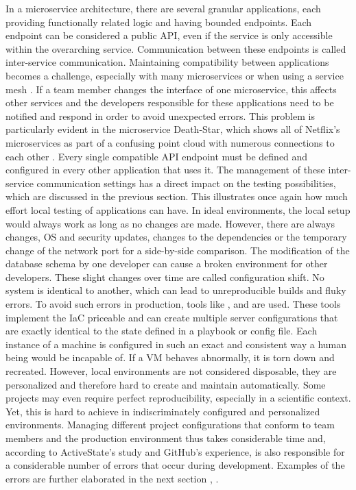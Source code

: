         In a microservice architecture, there are several granular applications, each providing functionally related logic and having bounded endpoints. Each endpoint can be considered a public \ac{API}, even if the service is only accessible within the overarching service. Communication between these endpoints is called inter-service communication. Maintaining compatibility between applications becomes a challenge, especially with many microservices or when using a service mesh \cite{micro}. If a team member changes the interface of one microservice, this affects other services and the developers responsible for these applications need to be notified and respond in order to avoid unexpected errors. This problem is particularly evident in the microservice Death-Star, which shows all of Netflix's microservices as part of a confusing point cloud with numerous connections to each other \cite{deathstar}. Every single compatible \ac{API} endpoint must be defined and configured in every other application that uses it. The management of these inter-service communication settings has a direct impact on the testing possibilities, which are discussed in the previous section. This illustrates once again how much effort local testing of applications can have.\newline
        In ideal environments, the local setup would always work as long as no changes are made. However, there are always changes, \ac{OS} and security updates, changes to the dependencies or the temporary change of the network port for a side-by-side comparison. The modification of the database schema by one developer can cause a broken environment for other developers. These slight changes over time are called configuration shift. No system is identical to another, which can lead to unreproducible builds and fluky errors. To avoid such errors in production, tools like , and  are used. These tools implement the \ac{IaC} priceable and can create multiple server configurations that are exactly identical to the state defined in a playbook or config file. Each instance of a machine is configured in such an exact and consistent way a human being would be incapable of. If a \ac{VM} behaves abnormally, it is torn down and recreated. However, local environments are not considered disposable, they are personalized and therefore hard to create and maintain automatically. Some projects may even require perfect reproducibility, especially in a scientific context. Yet, this is hard to achieve in indiscriminately configured and personalized environments.\newline
        Managing different project configurations that conform to team members and the production environment thus takes considerable time and, according to ActiveState's study and GitHub's experience, is also responsible for a considerable number of errors that occur during development. Examples of the errors are further elaborated in the next section \cite{setuppain}, \cite{githubblogcodespace}.

